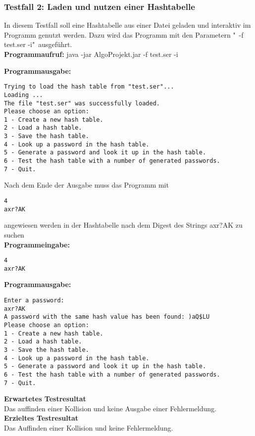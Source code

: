 \documentclass[11pt]{article}
\begin{document}
\subsubsection{Testfall 2: Laden und nutzen einer Hashtabelle}
In diesem Testfall soll eine Hashtabelle aus einer Datei geladen und interaktiv im Programm genutzt werden. Dazu wird das Programm mit den Parametern "\ -f test.ser -i"\ ausgeführt.\\
\textbf{Programmaufruf:} java -jar AlgoProjekt.jar -f test.ser -i \\
\begin{samepage}
\textbf{Programmausgabe:}
\begin{verbatim}
Trying to load the hash table from "test.ser"...
Loading ...
The file "test.ser" was successfully loaded.
Please choose an option:
1 - Create a new hash table.
2 - Load a hash table.
3 - Save the hash table.
4 - Look up a password in the hash table.
5 - Generate a password and look it up in the hash table.
6 - Test the hash table with a number of generated passwords.
7 - Quit.
\end{verbatim}
\end{samepage}
\begin{samepage}
Nach dem Ende der Ausgabe muss das Programm mit \begin{verbatim}4 
axr?AK 
\end{verbatim} 
angewiesen werden in der Hashtabelle nach dem Digest des Strings axr?AK zu suchen\\
\textbf{Programmeingabe:}
\begin{verbatim}
4
axr?AK
\end{verbatim}
\textbf{Programmausgabe:}
\begin{verbatim} 
Enter a password:
axr?AK
A password with the same hash value has been found: )aQ$LU
Please choose an option:
1 - Create a new hash table.
2 - Load a hash table.
3 - Save the hash table.
4 - Look up a password in the hash table.
5 - Generate a password and look it up in the hash table.
6 - Test the hash table with a number of generated passwords.
7 - Quit.
\end{verbatim}
\end{samepage}
\textbf{Erwartetes Testresultat}\\
Das auffinden einer Kollision und keine Ausgabe einer Fehlermeldung.\\
\textbf{Erzieltes Testresultat}\\
Das Auffinden einer Kollision und keine Fehlermeldung.
\newpage
\end{document}
